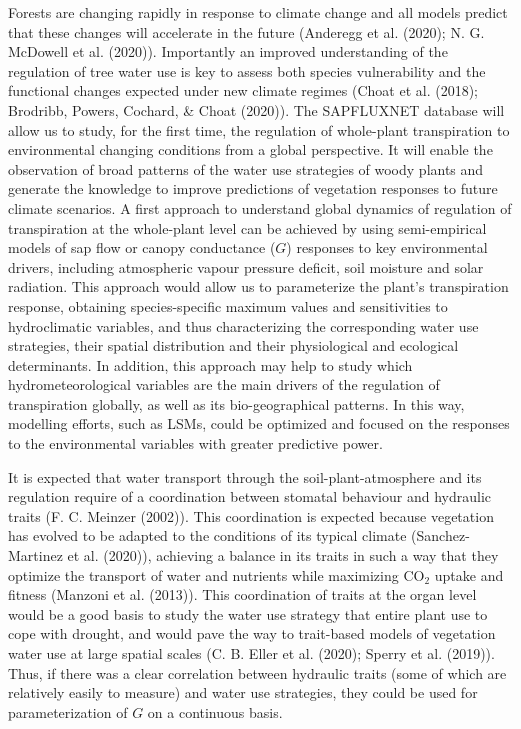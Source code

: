\documentclass[11pt,twoside]{reedthesis}
\begin{document}
Forests are changing rapidly in response to climate change and all
models predict that these changes will accelerate in the future
(Anderegg et al. (2020); N. G. McDowell et al. (2020)). Importantly an
improved understanding of the regulation of tree water use is key to
assess both species vulnerability and the functional changes expected
under new climate regimes (Choat et al. (2018); Brodribb, Powers,
Cochard, \& Choat (2020)). The SAPFLUXNET database will allow us to
study, for the first time, the regulation of whole-plant transpiration
to environmental changing conditions from a global perspective. It will
enable the observation of broad patterns of the water use strategies of
woody plants and generate the knowledge to improve predictions of
vegetation responses to future climate scenarios. A first approach to
understand global dynamics of regulation of transpiration at the
whole-plant level can be achieved by using semi-empirical models of sap
flow or canopy conductance (\(G\)) responses to key environmental
drivers, including atmospheric vapour pressure deficit, soil moisture
and solar radiation. This approach would allow us to parameterize the
plant's transpiration response, obtaining species-specific maximum
values and sensitivities to hydroclimatic variables, and thus
characterizing the corresponding water use strategies, their spatial
distribution and their physiological and ecological determinants. In
addition, this approach may help to study which hydrometeorological
variables are the main drivers of the regulation of transpiration
globally, as well as its bio-geographical patterns. In this way,
modelling efforts, such as LSMs, could be optimized and focused on the
responses to the environmental variables with greater predictive
power.\par

It is expected that water transport through the soil-plant-atmosphere
and its regulation require of a coordination between stomatal behaviour
and hydraulic traits (F. C. Meinzer (2002)). This coordination is
expected because vegetation has evolved to be adapted to the conditions
of its typical climate (Sanchez-Martinez et al. (2020)), achieving a
balance in its traits in such a way that they optimize the transport of
water and nutrients while maximizing \(\text{CO}_2\) uptake and fitness
(Manzoni et al. (2013)). This coordination of traits at the organ level
would be a good basis to study the water use strategy that entire plant
use to cope with drought, and would pave the way to trait-based models
of vegetation water use at large spatial scales (C. B. Eller et al.
(2020); Sperry et al. (2019)). Thus, if there was a clear correlation
between hydraulic traits (some of which are relatively easily to
measure) and water use strategies, they could be used for
parameterization of \(G\) on a continuous basis.\par
\end{document}
